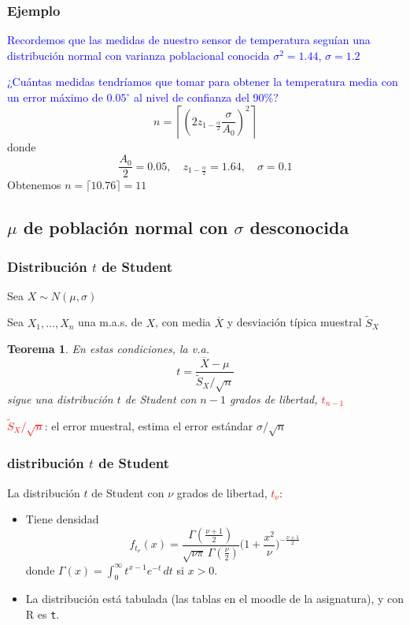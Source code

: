 \documentclass[12pt,t]{beamer}
\newcommand{\red}[1]{\textcolor{red}{#1}}
\newcommand{\blue}[1]{\textcolor{blue}{#1}}
\renewcommand{\emph}[1]{{\color{red}#1}}
\theoremstyle{plain}
\newtheorem{teorema}{Teorema}
\theoremstyle{definition}
\begin{document}
\begin{frame}
\frametitle{Ejemplo}

\blue{Recordemos  que las medidas de nuestro sensor  de temperatura seguían una distribución normal con varianza poblacional conocida $\sigma^2=1.44$,  $\sigma=1.2$}
\medskip

\blue{¿Cuántas medidas tendríamos que tomar para obtener la  temperatura media  con un error máximo de $0.05^{\circ}$ al nivel de confianza del 90\%?}
$$
n=\left\lceil \left( 2 z_{1-\frac{\alpha}{2}}\frac{\sigma}{A_0}
\right)^2\right\rceil$$
donde 
$$
\frac{A_0}{2}=0.05,\quad z_{1-\frac{\alpha}{2}}=1.64,\quad \sigma=0.1
$$
Obtenemos $n= \lceil10.76\rceil= 11$
\end{frame}



\subsection{$\mu$ de población normal con $\sigma$ desconocida}

\begin{frame}
\frametitle{Distribución $t$ de Student}


Sea $X\sim N(\mu,\sigma)$
\medskip

Sea $X_1,\ldots,X_n$ una m.a.s. de $X$, con media   $\overline{X}$ y desviación típica muestral $\widetilde{S}_{X}$
\medskip

\begin{teorema}
En estas condiciones, la v.a.
$$
t=\frac{\overline{X}-\mu}{\widetilde{S}_{X}/\sqrt{n}}
$$
sigue una distribución \emph{$t$ de Student} con $n-1$ grados de libertad, \red{$t_{n-1}$}
\end{teorema}
\medskip

\red{$\widetilde{S}_{X}/\sqrt{n}$}: el \emph{error muestral}, estima el error estándar $\sigma/\sqrt{n}$
\end{frame}



\begin{frame}
\frametitle{distribución $t$ de Student}


La distribución $t$ de Student con $\nu$ grados de libertad, \red{$t_{\nu}$}:
\medskip

\begin{itemize}
\item  Tiene  densidad
$$
f_{t_\nu}(x) = \frac{\Gamma(\frac{\nu+1}{2})} {\sqrt{\nu\pi}\,\Gamma(\frac{\nu}{2})} \Big(1+\frac{x^2}{\nu} \Big)^{-\frac{\nu+1}{2}}
$$
donde $\Gamma(x)=\int_{0}^{\infty} t^{x-1}e^{-t}\, dt$ si $x> 0$. 
\bigskip

\item La distribución está tabulada (\emph{las tablas en el moodle de la asignatura}), y con R es \texttt{t}.
\end{itemize}
\end{frame}
\end{document}
